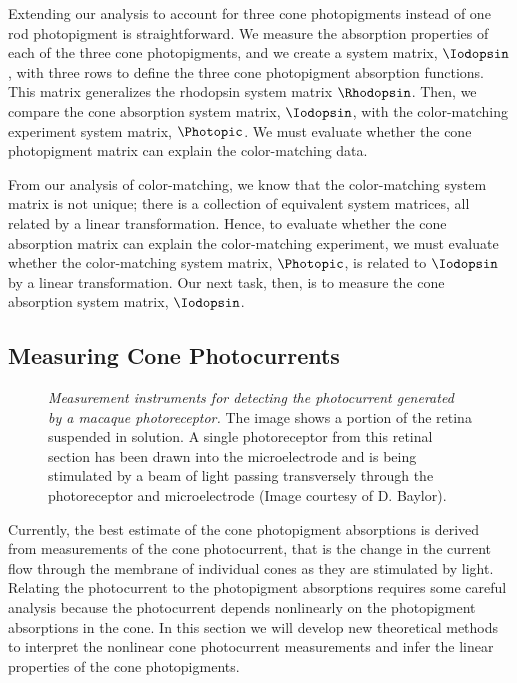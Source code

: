 Extending our analysis
to account for three cone photopigments 
instead of one rod photopigment is straightforward.
We measure the absorption properties of
each of the three cone photopigments,
and we create a system matrix, $\Iodopsin$,
with three rows to define
the three cone photopigment absorption functions.
This matrix generalizes the
rhodopsin system matrix $\Rhodopsin$.
Then, we compare the cone absorption system matrix,
$\Iodopsin$, with the color-matching experiment system matrix, $\Photopic$.
We must evaluate whether the cone photopigment matrix 
can explain the color-matching data.

From our analysis of color-matching,
we know that the color-matching system matrix is not unique;
there is a collection of equivalent system matrices, all
related by a linear transformation.
Hence, to  evaluate whether the cone absorption matrix
can explain the color-matching experiment,
we must evaluate whether
the color-matching system matrix, $\Photopic$,
is related to $\Iodopsin$ by a linear transformation.
Our next task, then, is to measure the cone absorption
system matrix, $\Iodopsin$.

\subsection*{Measuring Cone Photocurrents}
\begin{figure}
\centerline {
}
\caption[Photoreceptor Measurements]{
{\em Measurement instruments
for detecting the photocurrent generated by a macaque photoreceptor.}
The image shows a portion of the retina suspended in solution.
A single photoreceptor from this retinal section
has been drawn into
the microelectrode and is being stimulated by
a beam of light passing transversely through the
photoreceptor and microelectrode (Image courtesy of D. Baylor).
}
\label{f3:electrode}
\end{figure}
Currently, the best
estimate of the cone photopigment absorptions
is derived from measurements
of the cone photocurrent, that is the
change in the current flow through the membrane of
individual cones as they are stimulated by light.
Relating the photocurrent to the photopigment absorptions
requires some careful analysis because
the photocurrent depends nonlinearly on the
photopigment absorptions in the cone.
In this section we will develop new theoretical methods to
interpret the nonlinear cone photocurrent measurements
and infer the linear properties of the cone photopigments.

